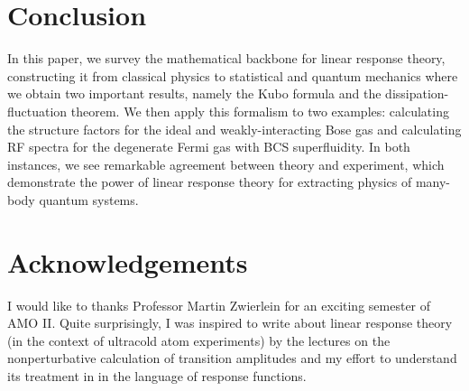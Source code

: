 \documentclass[prl,
twocolumn,
nofootinbib,
amsmath,amssymb,
aps]{revtex4-1}
\begin{document}
\section{Conclusion}

In this paper, we survey the mathematical backbone for linear response theory, constructing it from classical physics to statistical and quantum mechanics where we obtain two important results, namely the Kubo formula and the dissipation-fluctuation theorem. We then apply this formalism to two examples: calculating the structure factors for the ideal and weakly-interacting Bose gas and calculating RF spectra for the degenerate Fermi gas with BCS superfluidity. In both instances, we see remarkable agreement between theory and experiment, which demonstrate the power of linear response theory for extracting physics of many-body quantum systems. 


\section{Acknowledgements}
	I would like to thanks Professor Martin Zwierlein for an exciting semester of AMO II. Quite surprisingly, I was inspired to write about linear response theory (in the context of ultracold atom experiments) by the lectures on the nonperturbative calculation of transition amplitudes and my effort to understand its treatment in \cite{cohen1998atom} in the language of response functions.



\end{document}
